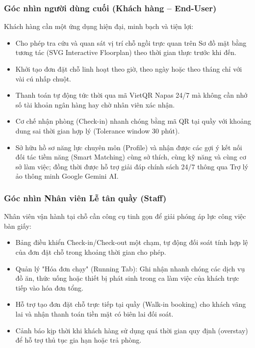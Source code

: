 \subsubsection{Góc nhìn người dùng cuối (Khách hàng -- End-User)}
Khách hàng cần một ứng dụng hiện đại, minh bạch và tiện lợi:
\begin{itemize}
    \item Cho phép tra cứu và quan sát vị trí chỗ ngồi trực quan trên Sơ đồ mặt bằng tương tác (SVG Interactive Floorplan) theo thời gian thực trước khi đến.
    \item Khởi tạo đơn đặt chỗ linh hoạt theo giờ, theo ngày hoặc theo tháng chỉ với vài cú nhấp chuột.
    \item Thanh toán tự động tức thời qua mã VietQR Napas 24/7 mà không cần nhớ số tài khoản ngân hàng hay chờ nhân viên xác nhận.
    \item Cơ chế nhận phòng (Check-in) nhanh chóng bằng mã QR tại quầy với khoảng dung sai thời gian hợp lý (Tolerance window 30 phút).
    \item Sở hữu hồ sơ năng lực chuyên môn (Profile) và nhận được các gợi ý kết nối đối tác tiềm năng (Smart Matching) cùng sở thích, cùng kỹ năng và cùng cơ sở làm việc; đồng thời được hỗ trợ giải đáp chính sách 24/7 thông qua Trợ lý ảo thông minh Google Gemini AI.
\end{itemize}

\subsubsection{Góc nhìn Nhân viên Lễ tân quầy (Staff)}
Nhân viên vận hành tại chỗ cần công cụ tinh gọn để giải phóng áp lực công việc bàn giấy:
\begin{itemize}
    \item Bảng điều khiển Check-in/Check-out một chạm, tự động đối soát tính hợp lệ của đơn đặt chỗ trong khoảng thời gian cho phép.
    \item Quản lý "Hóa đơn chạy" (Running Tab): Ghi nhận nhanh chóng các dịch vụ đồ ăn, thức uống hoặc thiết bị phát sinh trong ca làm việc của khách trực tiếp vào hóa đơn tổng.
    \item Hỗ trợ tạo đơn đặt chỗ trực tiếp tại quầy (Walk-in booking) cho khách vãng lai và nhận thanh toán tiền mặt có biên lai đối soát.
    \item Cảnh báo kịp thời khi khách hàng sử dụng quá thời gian quy định (overstay) để hỗ trợ thủ tục gia hạn hoặc trả phòng.
\end{itemize}

